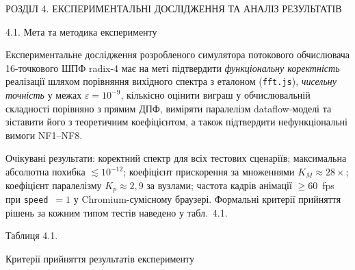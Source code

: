 
\protect{}\label{_Toc229681164}{}РОЗДІЛ 4. ЕКСПЕРИМЕНТАЛЬНІ
ДОСЛІДЖЕННЯ ТА АНАЛІЗ РЕЗУЛЬТАТІВ

\protect{}\label{_Toc229681165}{}4.1. Мета та методика
експерименту

Експериментальне дослідження розробленого симулятора потокового
обчислювача 16-точкового ШПФ radix-4 має на меті підтвердити
\emph{функціональну коректність} реалізації шляхом порівняння вихідного
спектра з еталоном (\texttt{fft.js}), \emph{чисельну точність} у межах
\(\varepsilon=10^{-9}\), кількісно оцінити виграш у обчислювальній
складності порівняно з прямим ДПФ, виміряти паралелізм dataflow-моделі
та зіставити його з теоретичним коефіцієнтом, а також підтвердити
нефункціональні вимоги NF1--NF8.

Очікувані результати: коректний спектр для всіх тестових сценаріїв;
максимальна абсолютна похибка \(\lesssim10^{-12}\); коефіцієнт
прискорення за множеннями \(K_M\approx28\times\); коефіцієнт
паралелізму \(K_p\approx2{,}9\) за вузлами; частота кадрів анімації
\(\geq60\)~fps при \texttt{speed}~\(=1\) у Chromium-сумісному браузері.
Формальні критерії прийняття рішень за кожним типом тестів наведено у
табл.~4.1.

Таблиця 4.1.

Критерії прийняття результатів експерименту

